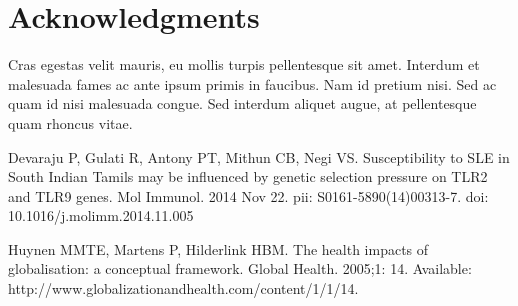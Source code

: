 \documentclass[10pt,letterpaper]{article}
\begin{document}
\section*{Acknowledgments}
Cras egestas velit mauris, eu mollis turpis pellentesque sit amet. Interdum et malesuada fames ac ante ipsum primis in faucibus. Nam id pretium nisi. Sed ac quam id nisi malesuada congue. Sed interdum aliquet augue, at pellentesque quam rhoncus vitae.

\nolinenumbers

%
%
% 
\begin{thebibliography}{10}
Devaraju P, Gulati R, Antony PT, Mithun CB, Negi VS. Susceptibility to SLE in South Indian Tamils may be influenced by genetic selection pressure on TLR2 and TLR9 genes. Mol Immunol. 2014 Nov 22. pii: S0161-5890(14)00313-7. doi: 10.1016/j.molimm.2014.11.005

Huynen MMTE, Martens P, Hilderlink HBM. The health impacts of globalisation: a conceptual framework. Global Health. 2005;1: 14. Available: http://www.globalizationandhealth.com/content/1/1/14.

\end{thebibliography}
\end{document}
